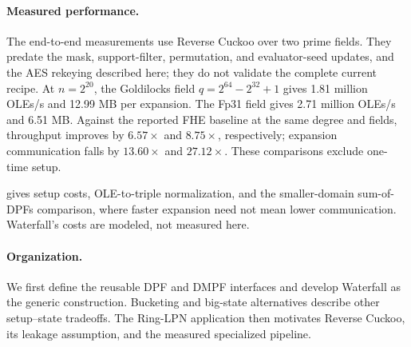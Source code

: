 \paragraph{Measured performance.}
The end-to-end measurements use Reverse Cuckoo over two prime fields.
They predate the mask, support-filter, permutation, and evaluator-seed
updates, and the AES rekeying described here; they do not validate the
complete current recipe.
At $n=2^{20}$, the Goldilocks field
$q=2^{64}-2^{32}+1$ gives 1.81 million OLEs/s and 12.99 MB per expansion.
The Fp31 field gives 2.71 million OLEs/s and 6.51 MB.
Against the reported FHE baseline at the same degree and fields, throughput
improves by $6.57\times$ and $8.75\times$, respectively; expansion
communication falls by $13.60\times$ and $27.12\times$.
These comparisons exclude one-time setup.

 gives setup costs, OLE-to-triple normalization, and
the smaller-domain sum-of-DPFs comparison, where faster expansion need not
mean lower communication. Waterfall's costs are modeled, not measured here.

\paragraph{Organization.}
We first define the reusable DPF and DMPF interfaces and develop Waterfall
as the generic construction.
Bucketing and big-state alternatives describe other setup--state tradeoffs.
The Ring-LPN application then motivates Reverse Cuckoo, its leakage
assumption, and the measured specialized pipeline.
